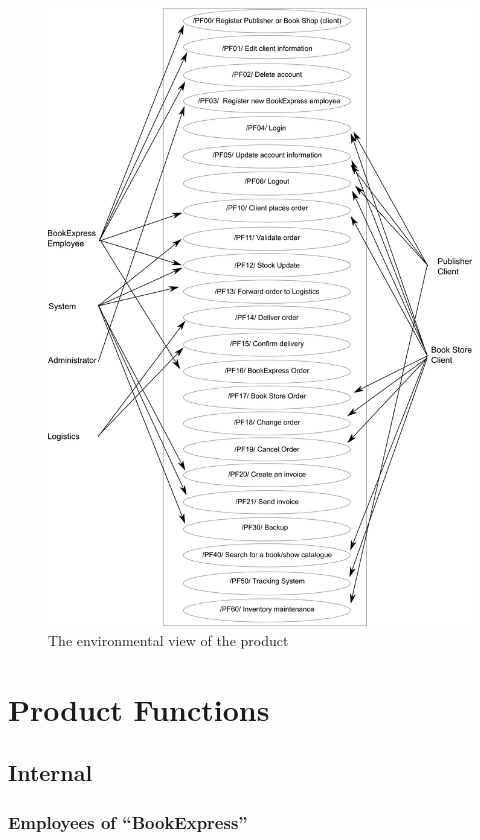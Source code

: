 \documentclass[11pt,a4paper,oneside,svgnames]{report}
\begin{document}
\begin{figure}[h!]
 \begin{center}
  \includegraphics[width=\textwidth]{diagrams/BusinessProcessDiagram.png}
 \end{center}
 \caption{The environmental view of the product}
\end{figure}


\chapter{Product Functions}
\label{sec:product-functions}

\section{Internal}
\subsection{Employees of ``BookExpress''}
\end{document}
